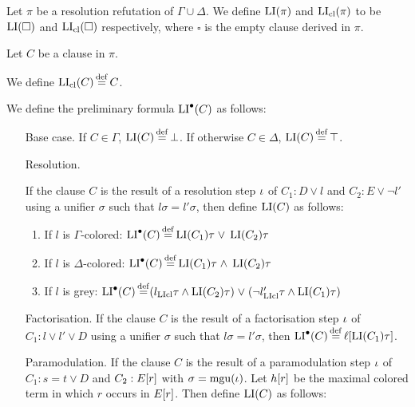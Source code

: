 \documentclass[,%
	draft=false,%
	numbers=noendperiod
	11pt,
	a4paper,
	oneside,%
	openany,
]{memoir}
\begin{document}
\begin{defi}
	Let $\pi$ be a resolution refutation of $\Gamma \cup \Delta$.
	We define $\operatorname{LI}(\pi)$ and $\operatorname{LI}_{\operatorname{cl}}(\pi)$ to be $\operatorname{LI}(\square)$ and $\operatorname{LI}_{\operatorname{cl}}(\square)$ respectively, where $\square$ is the empty clause derived in $\pi$.

	Let $C$ be a clause in $\pi$. 

	We define $\operatorname{LI}_{\operatorname{cl}}(C) \operatorname{\stackrel{\mathrm{def}}{=}} C$. 

	We define the preliminary formula $\operatorname{LI}^\bullet(C)$ as follows:

	\begin{itemize}
		\item[Base case.]
			If $C \in \Gamma$, $\operatorname{LI}(C) \operatorname{\stackrel{\mathrm{def}}{=}} \bot$.
			If otherwise $C \in \Delta$, $\operatorname{LI}(C) \operatorname{\stackrel{\mathrm{def}}{=}} \top$.
		\item[Resolution.]

			If the clause $C$ is the result of a resolution step $\iota$ of $C_1: D \lor l$ and $C_2: E \lor \lnot l'$ using a unifier $\sigma$ such that $l\sigma =  l'\sigma$, then define $\operatorname{LI}(C)$ as follows:

			\begin{enumerate}

				\item If $l$ is $\Gamma$-colored:
					$\operatorname{LI}^\bullet(C) \operatorname{\stackrel{\mathrm{def}}{=}} \operatorname{LI}(C_1)\tau\;{\lor}\; \operatorname{LI}(C_2)\tau $

				\item If $l$ is $\Delta$-colored:
					$\operatorname{LI}^\bullet(C) \operatorname{\stackrel{\mathrm{def}}{=}} \operatorname{LI}(C_1)\tau\;{\land}\; \operatorname{LI}(C_2)\tau$

				\item If $l$ is grey:
					$\operatorname{LI}^\bullet(C) \operatorname{\stackrel{\mathrm{def}}{=}}
					(l_{\operatorname{LIcl}}\tau \land \operatorname{LI}(C_2)\tau) \;{\lor}\;
					(\lnot l'_{\operatorname{LIcl}}\tau\land \operatorname{LI}(C_1)\tau)
					$

			\end{enumerate}

		\item[Factorisation.]
			If the clause $C$ is the result of a factorisation step $\iota$ of $C_1: l \lor l' \lor D$ using a unifier $\sigma$ such that $l\sigma = l'\sigma$, then $\operatorname{LI}^\bullet(C) \operatorname{\stackrel{\mathrm{def}}{=}} \ell[\operatorname{LI}(C_1)\tau]$.

		\item[Paramodulation.]
			If the clause $C$ is the result of a paramodulation step $\iota$ of $C_1 : s = t \lor D$ and $C_2: E[r]$ with $\sigma = \operatorname{mgu}(\iota)$.
			Let $h[r]$ be the maximal colored term in which $r$ occurs in $E[r]$.
			Then define $\operatorname{LI}(C)$ as follows:


\end{itemize}
\end{defi}
\end{document}
